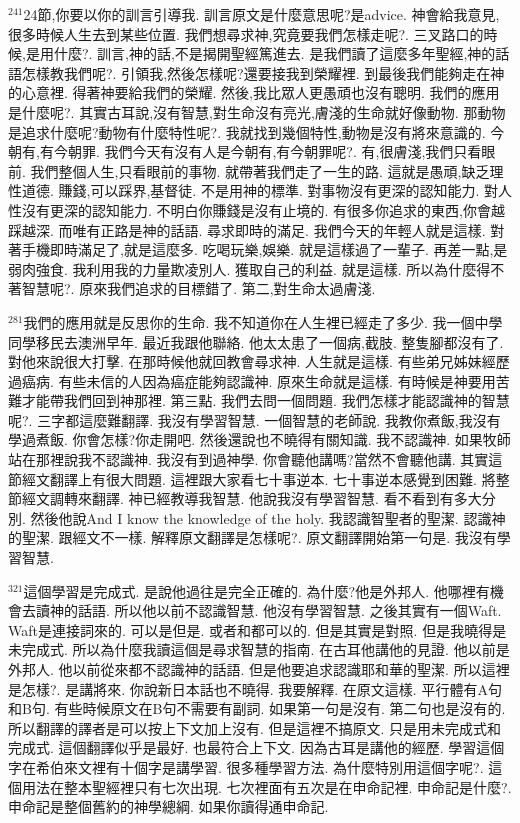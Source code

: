 \documentclass{book}
\begin{document}
$^{241}$24節,你要以你的訓言引導我.
訓言原文是什麼意思呢?是advice.
神會給我意見,很多時候人生去到某些位置.
我們想尋求神,究竟要我們怎樣走呢?.
三叉路口的時候,是用什麼?.
訓言,神的話,不是揭開聖經篤進去.
是我們讀了這麼多年聖經,神的話語怎樣教我們呢?.
引領我,然後怎樣呢?還要接我到榮耀裡.
到最後我們能夠走在神的心意裡.
得著神要給我們的榮耀.
然後,我比眾人更愚頑也沒有聰明.
我們的應用是什麼呢?.
其實古耳說,沒有智慧,對生命沒有亮光,膚淺的生命就好像動物.
那動物是追求什麼呢?動物有什麼特性呢?.
我就找到幾個特性,動物是沒有將來意識的.
今朝有,有今朝罪.
我們今天有沒有人是今朝有,有今朝罪呢?.
有,很膚淺,我們只看眼前.
我們整個人生,只看眼前的事物.
就帶著我們走了一生的路.
這就是愚頑,缺乏理性道德.
賺錢,可以踩界,基督徒.
不是用神的標準.
對事物沒有更深的認知能力.
對人性沒有更深的認知能力.
不明白你賺錢是沒有止境的.
有很多你追求的東西,你會越踩越深.
而唯有正路是神的話語.
尋求即時的滿足.
我們今天的年輕人就是這樣.
對著手機即時滿足了,就是這麼多.
吃喝玩樂,娛樂.
就是這樣過了一輩子.
再差一點,是弱肉強食.
我利用我的力量欺凌別人.
獲取自己的利益.
就是這樣.
所以為什麼得不著智慧呢?.
原來我們追求的目標錯了.
第二,對生命太過膚淺.

$^{281}$我們的應用就是反思你的生命.
我不知道你在人生裡已經走了多少.
我一個中學同學移民去澳洲早年.
最近我跟他聯絡.
他太太患了一個病,截肢.
整隻腳都沒有了.
對他來說很大打擊.
在那時候他就回教會尋求神.
人生就是這樣.
有些弟兄姊妹經歷過癌病.
有些未信的人因為癌症能夠認識神.
原來生命就是這樣.
有時候是神要用苦難才能帶我們回到神那裡.
第三點.
我們去問一個問題.
我們怎樣才能認識神的智慧呢?.
三字都這麼難翻譯.
我沒有學習智慧.
一個智慧的老師說.
我教你煮飯,我沒有學過煮飯.
你會怎樣?你走開吧.
然後還說也不曉得有關知識.
我不認識神.
如果牧師站在那裡說我不認識神.
我沒有到過神學.
你會聽他講嗎?當然不會聽他講.
其實這節經文翻譯上有很大問題.
這裡跟大家看七十事逆本.
七十事逆本感覺到困難.
將整節經文調轉來翻譯.
神已經教導我智慧.
他說我沒有學習智慧.
看不看到有多大分別.
然後他說And I know the knowledge of the holy.
我認識智聖者的聖潔.
認識神的聖潔.
跟經文不一樣.
解釋原文翻譯是怎樣呢?.
原文翻譯開始第一句是.
我沒有學習智慧.

$^{321}$這個學習是完成式.
是說他過往是完全正確的.
為什麼?他是外邦人.
他哪裡有機會去讀神的話語.
所以他以前不認識智慧.
他沒有學習智慧.
之後其實有一個Waft.
Waft是連接詞來的.
可以是但是.
或者和都可以的.
但是其實是對照.
但是我曉得是未完成式.
所以為什麼我讀這個是尋求智慧的指南.
在古耳他講他的見證.
他以前是外邦人.
他以前從來都不認識神的話語.
但是他要追求認識耶和華的聖潔.
所以這裡是怎樣?.
是講將來.
你說新日本話也不曉得.
我要解釋.
在原文這樣.
平行體有A句和B句.
有些時候原文在B句不需要有副詞.
如果第一句是沒有.
第二句也是沒有的.
所以翻譯的譯者是可以按上下文加上沒有.
但是這裡不搞原文.
只是用未完成式和完成式.
這個翻譯似乎是最好.
也最符合上下文.
因為古耳是講他的經歷.
學習這個字在希伯來文裡有十個字是講學習.
很多種學習方法.
為什麼特別用這個字呢?.
這個用法在整本聖經裡只有七次出現.
七次裡面有五次是在申命記裡.
申命記是什麼?.
申命記是整個舊約的神學總綱.
如果你讀得通申命記.
\end{document}
